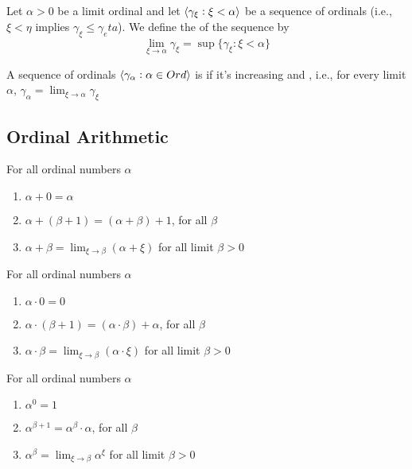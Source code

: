 \documentclass[11pt]{article}
\begin{document}
\begin{definition}[]
Let \(\alpha>0\) be a limit ordinal and let \(\langle\gamma_\xi:\xi<\alpha\rangle\) be a
 sequence of ordinals (i.e., \(\xi<\eta\) implies
\(\gamma_\xi\le\gamma_eta\)). We define the  of the sequence by
\begin{equation*}
\lim_{\xi\to\alpha}\gamma_\xi=\sup\{\gamma_\xi:\xi<\alpha\}
\end{equation*}

A sequence of ordinals \(\langle\gamma_\alpha:\alpha\in Ord\rangle\) is  if
it's increasing and , i.e., for every limit \(\alpha\),
\(\gamma_\alpha=\lim_{\xi\to\alpha}\gamma_\xi\) 
\end{definition}


\subsection{Ordinal Arithmetic}
\label{sec:orge7b976f}
\begin{definition}[Addition]
For all ordinal numbers \(\alpha\)
\begin{enumerate}
\item \(\alpha+0=\alpha\)
\item \(\alpha+(\beta+1)=(\alpha+\beta)+1\), for all \(\beta\)
\item \(\alpha+\beta=\lim_{\xi\to\beta}(\alpha+\xi)\) for all limit \(\beta>0\)
\end{enumerate}
\end{definition}

\begin{definition}[Multiplication]
For all ordinal numbers \(\alpha\)
\begin{enumerate}
\item \(\alpha\cdot 0=0\)
\item \(\alpha\cdot(\beta+1)=(\alpha\cdot\beta)+\alpha\), for all \(\beta\)
\item \(\alpha\cdot\beta=\lim_{\xi\to\beta}(\alpha\cdot\xi)\) for all limit \(\beta>0\)
\end{enumerate}
\end{definition}

\begin{definition}[Exponentiation]
For all ordinal numbers \(\alpha\)
\begin{enumerate}
\item \(\alpha^0=1\)
\item \(\alpha^{\beta+1}=\alpha^\beta\cdot\alpha\), for all \(\beta\)
\item \(\alpha^\beta=\lim_{\xi\to\beta}\alpha^\xi\) for all limit \(\beta>0\)
\end{enumerate}
\end{definition}
\end{document}
